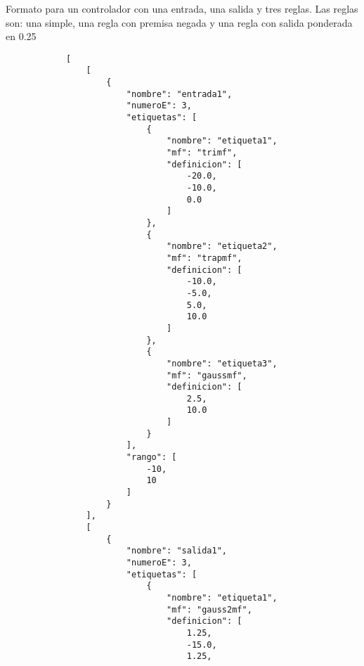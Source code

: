     \begin{longlisting}
        \caption[Formato para guardar controlador]{Formato para un controlador con una entrada, una salida y tres reglas. Las reglas son: una simple, una regla con premisa negada y una regla con salida ponderada en 0.25}
        \label{code:1}				
        \begin{verbatim}
            [
                [
                    {
                        "nombre": "entrada1",
                        "numeroE": 3,
                        "etiquetas": [
                            {
                                "nombre": "etiqueta1",
                                "mf": "trimf",
                                "definicion": [
                                    -20.0,
                                    -10.0,
                                    0.0
                                ]
                            },
                            {
                                "nombre": "etiqueta2",
                                "mf": "trapmf",
                                "definicion": [
                                    -10.0,
                                    -5.0,
                                    5.0,
                                    10.0
                                ]
                            },
                            {
                                "nombre": "etiqueta3",
                                "mf": "gaussmf",
                                "definicion": [
                                    2.5,
                                    10.0
                                ]
                            }
                        ],
                        "rango": [
                            -10,
                            10
                        ]
                    }
                ],
                [
                    {
                        "nombre": "salida1",
                        "numeroE": 3,
                        "etiquetas": [
                            {
                                "nombre": "etiqueta1",
                                "mf": "gauss2mf",
                                "definicion": [
                                    1.25,
                                    -15.0,
                                    1.25,

\end{verbatim}
\end{longlisting}
